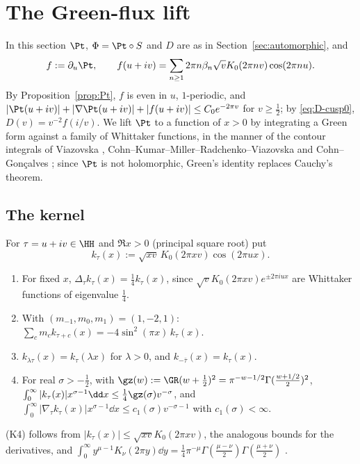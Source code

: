 \section{The Green-flux lift}\label{sec:lift}

In this section $\Pt$, $\Phi=\Pt\circ S$ and $D$ are as in Section~\ref{sec:automorphic}, and
\begin{equation}\label{eq:f}
f:=\partial_u\Pt,\qquad f(u+iv)=\sum_{n\ge1}2\pi n\beta_n\sqrt vK_0(2\pi nv)\cos(2\pi nu).
\end{equation}
By Proposition~\ref{prop:Pt}, $f$ is even in $u$, $1$-periodic, and $|\Pt(u+iv)|+|\nabla\Pt(u+iv)|+|f(u+iv)|\le C_0e^{-2\pi v}$ for $v\ge\frac12$;
by \eqref{eq:D-cusp0}, $D(v)=v^{-2}f(i/v)$. We lift $\Pt$ to a function of $x>0$ by integrating a Green form against a family of Whittaker
functions, in the manner of the contour integrals of Viazovska \cite{Via17}, Cohn--Kumar--Miller--Radchenko--Viazovska \cite{CKMRV17,CKMRV22}
and Cohn--Gon\c{c}alves \cite{CG19}; since $\Pt$ is not holomorphic, Green's identity replaces Cauchy's theorem.

\subsection{The kernel}

For $\tau=u+iv\in\HH$ and $\Re x>0$ (principal square root) put
\begin{equation}\label{eq:kernel}
k_\tau(x):=\sqrt{xv}\,K_0(2\pi xv)\cos(2\pi ux).
\end{equation}
\begin{enumerate}[label=\textup{(K\arabic*)}]
\item For fixed $x$, $\Delta_\tau k_\tau(x)=\frac14k_\tau(x)$, since $\sqrt vK_0(2\pi xv)e^{\pm2\pi iux}$ are Whittaker functions of eigenvalue $\frac14$.
\item With $(m_{-1},m_0,m_1)=(1,-2,1)$: $\sum_cm_ck_{\tau+c}(x)=-4\sin^2(\pi x)\,k_\tau(x)$.
\item $k_{\lambda\tau}(x)=k_\tau(\lambda x)$ for $\lambda>0$, and $k_{-\bar\tau}(x)=k_\tau(x)$.
\item For real $\sigma>-\frac12$, with $\gz(w):=\GR(w+\frac12)^2=\pi^{-w-1/2}\Gamma(\frac{w+1/2}2)^2$,
$\int_0^\infty|k_\tau(x)|x^{\sigma-1}\dd x\le\frac14\gz(\sigma)v^{-\sigma}$, and $\int_0^\infty|\nabla_\tau k_\tau(x)|x^{\sigma-1}\dd x\le c_1(\sigma)v^{-\sigma-1}$ with
$c_1(\sigma)<\infty$.
\end{enumerate}
(K4) follows from $|k_\tau(x)|\le\sqrt{xv}K_0(2\pi xv)$, the analogous bounds for the derivatives, and
$\int_0^\infty y^{\mu-1}K_\nu(2\pi y)\dd y=\frac14\pi^{-\mu}\Gamma(\frac{\mu-\nu}2)\Gamma(\frac{\mu+\nu}2)$ \cite[10.43.19]{DLMF}.

